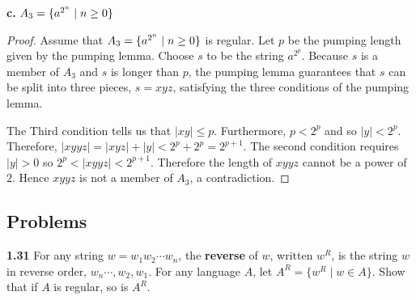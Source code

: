 \textbf{c.} $A_3 = \{{a^{2^n} \mid n \geq 0}\} $
\begin{mdframed}
\begin{proof}
Assume that $A_3 = \{{a^{2^n} \mid n \geq 0}\}$ is regular. Let $p$ be the pumping length given by the pumping lemma. Choose $s$ to be the string $a^{2^p}$. Because $s$ is a member of $A_3$ and $s$ is longer than $p$, the pumping lemma guarantees that $s$ can be split into three pieces, $s=xyz$, satisfying the three conditions of the pumping lemma.

The Third condition tells us that $|xy| \leq p$. Furthermore, $p < 2^p$ and so $|y| < 2^p$. Therefore, $|xyyz| = |xyz| + |y| < 2^p + 2^p = 2^{p+1}$. The second condition requires $|y| > 0$ so $2^p < |xyyz| < 2^{p+1}$. Therefore the length of $xyyz$ cannot be a power of $2$. Hence $xyyz$ is not a member of $A_3$, a contradiction.
\end{proof}
\end{mdframed}

\subsection{Problems}

\textbf{1.31} For any string $w = w_1 w_2 \cdots w_n$, the \textbf{reverse} of $w$, written $w^R$, is the string $w$ in reverse order, $w_n \cdots, w_2, w_1$. For any language $A$, let $A^R = \{ w^R \mid w \in A\}$. Show that if $A$ is regular, so is $A^R$.

